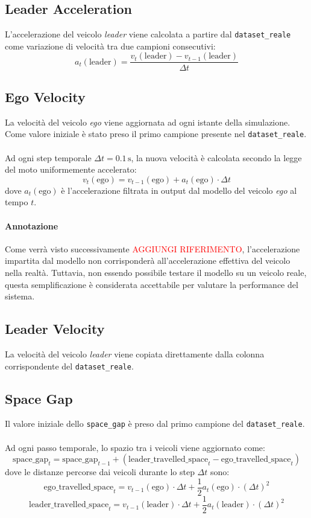 \subsection{Leader Acceleration}
L'accelerazione del veicolo \emph{leader} viene calcolata a partire dal \texttt{dataset\_reale} come 
variazione di velocità tra due campioni consecutivi:
\[
a_t(\mathrm{leader}) = \frac{v_t(\mathrm{leader}) - v_{t-1}(\mathrm{leader})}{\Delta t}
\]

\subsection{Ego Velocity}
La velocità del veicolo \emph{ego} viene aggiornata ad ogni istante della simulazione.
Come valore iniziale è stato preso il primo campione presente nel \texttt{dataset\_reale}.  
\\\\
\noindent Ad ogni step temporale $\Delta t = 0.1\,\mathrm{s}$, la nuova velocità è calcolata secondo la legge del moto uniformemente 
accelerato:
\[
v_t(\mathrm{ego}) = v_{t-1}(\mathrm{ego}) + a_t(\mathrm{ego}) \cdot \Delta t
\]
dove $a_t(\mathrm{ego})$ è l'accelerazione filtrata in output dal modello del veicolo \emph{ego} al tempo $t$.

\paragraph{Annotazione} Come verrà visto successivamente \textcolor{red}{AGGIUNGI RIFERIMENTO}, l'accelerazione impartita dal modello 
non corrisponderà all'accelerazione effettiva del veicolo nella realtà. Tuttavia, non essendo possibile testare il modello su un veicolo 
reale, questa semplificazione è considerata accettabile per valutare la performance del sistema.

\subsection{Leader Velocity}
La velocità del veicolo \emph{leader} viene copiata direttamente dalla colonna corrispondente del \texttt{dataset\_reale}.

\subsection{Space Gap}
Il valore iniziale dello \texttt{space\_gap} è preso dal primo campione del \texttt{dataset\_reale}.
\\\\
\noindent Ad ogni passo temporale, lo spazio tra i veicoli viene aggiornato come:
\[
\mathrm{space\_gap}_t = \mathrm{space\_gap}_{t-1} + \left( \mathrm{leader\_travelled\_space}_t - \mathrm{ego\_travelled\_space}_t \right)
\]
dove le distanze percorse dai veicoli durante lo step $\Delta t$ sono:
\[
\mathrm{ego\_travelled\_space}_t = v_{t-1}(\mathrm{ego}) \cdot \Delta t + \frac{1}{2} a_t(\mathrm{ego}) \cdot (\Delta t)^2
\]
\[
\mathrm{leader\_travelled\_space}_t = v_{t-1}(\mathrm{leader}) \cdot \Delta t + \frac{1}{2} a_t(\mathrm{leader}) \cdot (\Delta t)^2
\]

